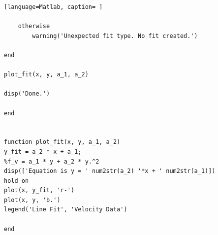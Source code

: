 \documentclass[12pt]{article}
\begin{document}
\begin{lstlisting}[language=Matlab, caption= ]
        
    otherwise
        warning('Unexpected fit type. No fit created.')
        
end

plot_fit(x, y, a_1, a_2)

disp('Done.')

end


function plot_fit(x, y, a_1, a_2)
y_fit = a_2 * x + a_1; 
%f_v = a_1 * y + a_2 * y.^2
disp(['Equation is y = ' num2str(a_2) '*x + ' num2str(a_1)])
hold on
plot(x, y_fit, 'r-')
plot(x, y, 'b.')
legend('Line Fit', 'Velocity Data')

end
\end{lstlisting}

 
\end{document}
